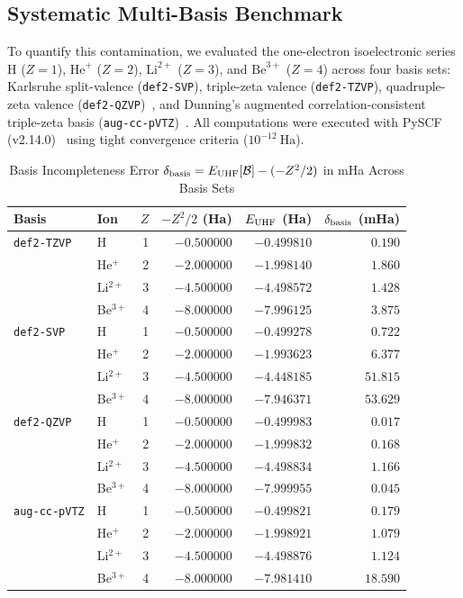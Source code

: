 \documentclass[journal]{IEEEtran}
\begin{document}
\subsection{Systematic Multi-Basis Benchmark}
To quantify this contamination, we evaluated the one-electron isoelectronic series $\text{H}$ ($Z=1$), $\text{He}^+$ ($Z=2$), $\text{Li}^{2+}$ ($Z=3$), and $\text{Be}^{3+}$ ($Z=4$) across four basis sets: Karlsruhe split-valence (\texttt{def2-SVP}), triple-zeta valence (\texttt{def2-TZVP}), quadruple-zeta valence (\texttt{def2-QZVP})~\cite{Weigend2005}, and Dunning's augmented correlation-consistent triple-zeta basis (\texttt{aug-cc-pVTZ})~\cite{Dunning1989}. All computations were executed with PySCF (v2.14.0)~\cite{PySCF2018,PySCF2020} using tight convergence criteria ($10^{-12}\ \text{Ha}$).

\begin{table}[htbp]
\centering
\caption{Basis Incompleteness Error $\delta_{\rm basis} = E_{\rm UHF}[\mathcal{B}] - (-Z^2/2)$ in mHa Across Basis Sets}
\label{tab:basis_incomp}
\begin{tabular}{llrrrr}
\toprule
Basis & Ion & $Z$ & $-Z^2/2$ (Ha) & $E_{\rm UHF}$ (Ha) & $\delta_{\rm basis}$ (mHa) \\
\midrule
\texttt{def2-TZVP} & H      & 1 & $-0.500000$ & $-0.499810$ & $0.190$ \\
                  & He$^+$  & 2 & $-2.000000$ & $-1.998140$ & $1.860$ \\
                  & Li$^{2+}$& 3 & $-4.500000$ & $-4.498572$ & $1.428$ \\
                  & Be$^{3+}$& 4 & $-8.000000$ & $-7.996125$ & $3.875$ \\
\midrule
\texttt{def2-SVP}  & H      & 1 & $-0.500000$ & $-0.499278$ & $0.722$ \\
                  & He$^+$  & 2 & $-2.000000$ & $-1.993623$ & $6.377$ \\
                  & Li$^{2+}$& 3 & $-4.500000$ & $-4.448185$ & $51.815$ \\
                  & Be$^{3+}$& 4 & $-8.000000$ & $-7.946371$ & $53.629$ \\
\midrule
\texttt{def2-QZVP} & H      & 1 & $-0.500000$ & $-0.499983$ & $0.017$ \\
                  & He$^+$  & 2 & $-2.000000$ & $-1.999832$ & $0.168$ \\
                  & Li$^{2+}$& 3 & $-4.500000$ & $-4.498834$ & $1.166$ \\
                  & Be$^{3+}$& 4 & $-8.000000$ & $-7.999955$ & $0.045$ \\
\midrule
\texttt{aug-cc-pVTZ}& H     & 1 & $-0.500000$ & $-0.499821$ & $0.179$ \\
                  & He$^+$  & 2 & $-2.000000$ & $-1.998921$ & $1.079$ \\
                  & Li$^{2+}$& 3 & $-4.500000$ & $-4.498876$ & $1.124$ \\
                  & Be$^{3+}$& 4 & $-8.000000$ & $-7.981410$ & $18.590$ \\
\bottomrule
\end{tabular}
\end{table}
\end{document}
